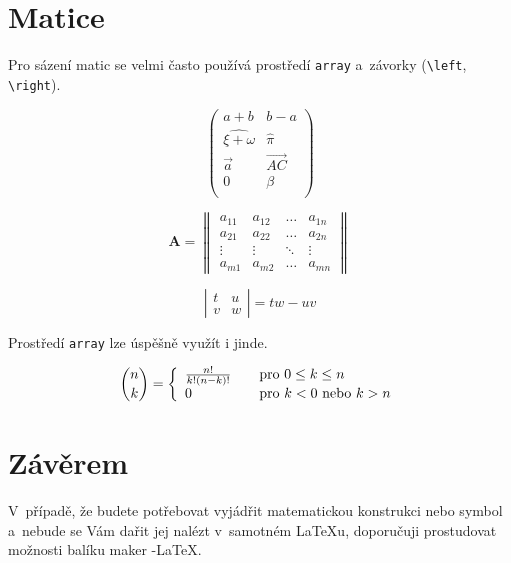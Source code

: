 \documentclass[a4paper,11pt,twocolumn,titlepage]{article}[11.3.2016]
\begin{document}
\section{Matice}

Pro sázení matic se velmi často používá prostředí \texttt{array} a~závorky  (\verb|\left|, \verb|\right|). 

$$\left( \begin{array}{cc}
a + b & b - a \\
\widehat{\xi + \omega} & \hat{\pi} \\
\vec{a} & \overrightarrow{AC} \\
0 & \beta\\
\end{array} \right)$$

$$\mathbf{A}=\left\|\begin{array}{cccc}
a_{11} & a_{12} & \ldots & a_{1n} \\
a_{21} & a_{22} & \ldots & a_{2n} \\
\vdots & \vdots & \ddots & \vdots \\
a_{m1} & a_{m2} & \ldots & a_{mn}
\end{array}\right\|$$

$$\left|\begin{array}{cc}
t & u \\ v & w
\end{array}\right| = tw - uv$$

Prostředí \texttt{array} lze úspěšně využít i jinde.

$$\binom{n}{k} = \left\{ 
\begin{array}{l l}
  \frac{n!}{k!(n-k)!} & \quad \mbox{pro $0 \leq k \leq n$}\\
  0 & \quad \mbox{pro $k < 0$ nebo $k > n$}\\
\end{array} \right. $$
 

\section{Závěrem}
V~případě, že budete potřebovat vyjádřit matema\-tickou konstrukci nebo symbol a~nebude se Vám dařit jej nalézt v~samotném \LaTeX u, doporučuji prostudovat možnosti balíku maker \AmS-\LaTeX.
\end{document}
